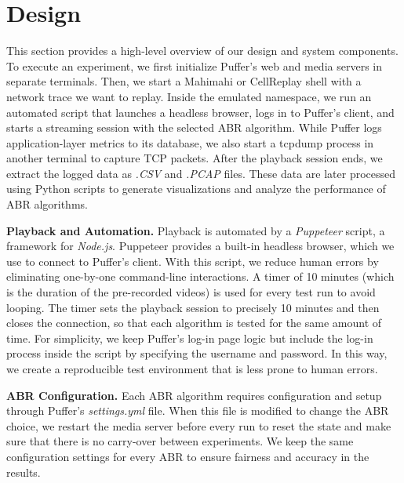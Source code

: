 \section{Design}\label{s:design}

This section provides a high-level overview of our design and system components. To execute an experiment, we first initialize Puffer's web and media servers in separate terminals. Then, we start a Mahimahi or CellReplay shell with a network trace we want to replay. Inside the emulated namespace, we run an automated script that launches a headless browser, logs in to Puffer's client, and starts a streaming session with the selected ABR algorithm. While Puffer logs application-layer metrics to its database, we also start a tcpdump process in another terminal to capture TCP packets. After the playback session ends, we extract the logged data as \emph{.CSV} and \emph{.PCAP} files. These data are later processed using Python scripts to generate visualizations and analyze the performance of ABR algorithms.

\textbf{Playback and Automation.}  
Playback is automated by a \emph{Puppeteer} script, a framework for \emph{Node.js}. Puppeteer provides a built-in headless browser, which we use to connect to Puffer's client. With this script, we reduce human errors by eliminating one-by-one command-line interactions. A timer of 10 minutes (which is the duration of the pre-recorded videos) is used for every test run to avoid looping. The timer sets the playback session to precisely 10 minutes and then closes the connection, so that each algorithm is tested for the same amount of time. For simplicity, we keep Puffer’s log-in page logic but include the log-in process inside the script by specifying the username and password. In this way, we create a reproducible test environment that is less prone to human errors.

\textbf{ABR Configuration.}  
Each ABR algorithm requires configuration and setup through Puffer’s \emph{settings.yml} file. When this file is modified to change the ABR choice, we restart the media server before every run to reset the state and make sure that there is no carry-over between experiments. We keep the same configuration settings for every ABR to ensure fairness and accuracy in the results.


